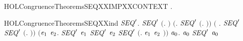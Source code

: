 \begin{SaveVerbatim}{HOLCongruenceTheoremsSEQXXIMPXXCONTEXT}
\HOLTokenTurnstile{} \HOLSymConst{\HOLTokenForall{}}.   \HOLSymConst{\HOLTokenImp{}}  
\end{SaveVerbatim}
\newcommand{\HOLCongruenceTheoremsSEQXXIMPXXCONTEXT}{\UseVerbatim{HOLCongruenceTheoremsSEQXXIMPXXCONTEXT}}
\begin{SaveVerbatim}{HOLCongruenceTheoremsSEQXXind}
\HOLTokenTurnstile{} \HOLSymConst{\HOLTokenForall{}}\ensuremath{\HOLBoundVar{SEQ}\sp{\prime}}.
       \ensuremath{\HOLBoundVar{SEQ}\sp{\prime}} \ensuremath{(}\HOLTokenLambda{}. \ensuremath{)} \HOLSymConst{\HOLTokenConj{}} \ensuremath{(}\HOLSymConst{\HOLTokenForall{}}. \ensuremath{\HOLBoundVar{SEQ}\sp{\prime}} \ensuremath{(}\HOLTokenLambda{}. \ensuremath{)}\ensuremath{)} \HOLSymConst{\HOLTokenConj{}}
       \ensuremath{(}\HOLSymConst{\HOLTokenForall{}} . \ensuremath{\HOLBoundVar{SEQ}\sp{\prime}}  \HOLSymConst{\HOLTokenImp{}} \ensuremath{\HOLBoundVar{SEQ}\sp{\prime}} \ensuremath{(}\HOLTokenLambda{}. \HOLSymConst{\ensuremath{\ldotp}} \ensuremath{)}\ensuremath{)} \HOLSymConst{\HOLTokenConj{}}
       \ensuremath{(}\HOLSymConst{\HOLTokenForall{}}\ensuremath{\HOLBoundVar{e}\sb{\mathrm{1}}} \ensuremath{\HOLBoundVar{e}\sb{\mathrm{2}}}. \ensuremath{\HOLBoundVar{SEQ}\sp{\prime}} \ensuremath{\HOLBoundVar{e}\sb{\mathrm{1}}} \HOLSymConst{\HOLTokenConj{}} \ensuremath{\HOLBoundVar{SEQ}\sp{\prime}} \ensuremath{\HOLBoundVar{e}\sb{\mathrm{2}}} \HOLSymConst{\HOLTokenImp{}} \ensuremath{\HOLBoundVar{SEQ}\sp{\prime}} \ensuremath{(}\HOLTokenLambda{}. \ensuremath{\HOLBoundVar{e}\sb{\mathrm{1}}}  \HOLSymConst{\ensuremath{+}} \ensuremath{\HOLBoundVar{e}\sb{\mathrm{2}}} \ensuremath{)}\ensuremath{)} \HOLSymConst{\HOLTokenImp{}}
       \HOLSymConst{\HOLTokenForall{}}\ensuremath{\HOLBoundVar{a}\sb{\mathrm{0}}}.  \ensuremath{\HOLBoundVar{a}\sb{\mathrm{0}}} \HOLSymConst{\HOLTokenImp{}} \ensuremath{\HOLBoundVar{SEQ}\sp{\prime}} \ensuremath{\HOLBoundVar{a}\sb{\mathrm{0}}}
\end{SaveVerbatim}
\newcommand{\HOLCongruenceTheoremsSEQXXind}{\UseVerbatim{HOLCongruenceTheoremsSEQXXind}}
